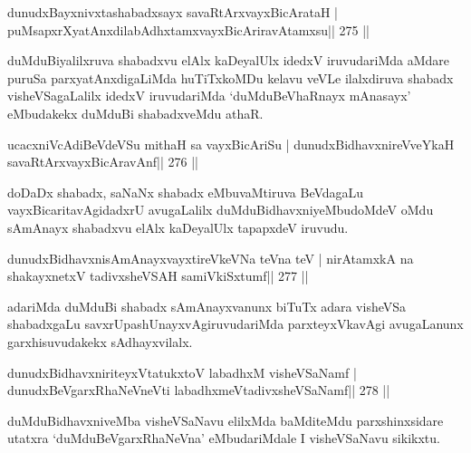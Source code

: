 
\begin{shl}
dunudxBayxnivxtashabadxsayx savaRtArxvayxBicArataH |
puMsapxrXyatAnxdilabAdhxtamxvayxBicAriravAtamxsu\hfill || 275 ||
\end{shl}

\begin{artha}
duMduBiyalilxruva shabadxvu elAlx kaDeyalUlx idedxV iruvudariMda aMdare puruSa parxyatAnxdigaLiMda huTiTxkoMDu kelavu veVLe ilalxdiruva shabadx visheVSagaLalilx idedxV iruvudariMda `duMduBeVhaRnayx mAnasayx' eMbudakekx duMduBi shabadxveMdu athaR.
\end{artha}


\begin{shl}
ucacxniVcAdiBeVdeVSu mithaH sa vayxBicAriSu |
dunudxBidhavxnireVveYkaH savaRtArxvayxBicAravAnf\hfill || 276 ||
\end{shl}

\begin{artha}
doDaDx shabadx, saNaNx shabadx eMbuvaMtiruva BeVdagaLu vayxBicaritavAgidadxrU avugaLalilx duMduBidhavxniyeMbudoMdeV oMdu sAmAnayx shabadxvu elAlx kaDeyalUlx tapapxdeV iruvudu.
\end{artha}

\begin{shl}
dunudxBidhavxnisAmAnayxvayxtireVkeVNa teVna teV |
nirAtamxkA na shakayxnetxV tadivxsheVSAH samiVkiSxtumf\hfill || 277 ||
\end{shl}

\begin{artha}
adariMda duMduBi shabadx sAmAnayxvanunx biTuTx adara visheVSa shabadxgaLu savxrUpashUnayxvAgiruvudariMda parxteyxVkavAgi avugaLanunx garxhisuvudakekx sAdhayxvilalx.
\end{artha}

\begin{shl}
dunudxBidhavxniriteyxVtatukxtoV labadhxM visheVSaNamf |
dunudxBeVgarxRhaNeVneVti labadhxmeVtadivxsheVSaNamf\hfill || 278 ||
\end{shl}

\begin{artha}
duMduBidhavxniveMba visheVSaNavu elilxMda baMditeMdu parxshinxsidare utatxra `duMduBeVgarxRhaNeVna' eMbudariMdale I visheVSaNavu sikikxtu.
\end{artha}


